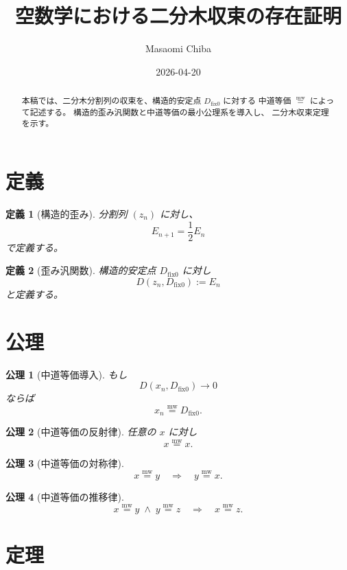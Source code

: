 \documentclass[12pt,a4paper]{article}
\newcommand{\mweq}{\mathrel{\overset{\mathrm{mw}}{=}}}
\newcommand{\dfix}{D_{\mathrm{fix}0}}
\newtheorem{definition}{定義}
\newtheorem{axiom}{公理}
\begin{document}
\title{空数学における二分木収束の存在証明}
\author{Masaomi Chiba}
\date{2026-04-20}
\maketitle

\begin{abstract}
本稿では、二分木分割列の収束を、構造的安定点 $\dfix$ に対する
中道等価 $\mweq$ によって記述する。
構造的歪み汎関数と中道等価の最小公理系を導入し、
二分木収束定理を示す。
\end{abstract}

\section{定義}

\begin{definition}[構造的歪み]
分割列 $(z_n)$ に対し、
\[
E_{n+1}=\frac12 E_n
\]
で定義する。
\end{definition}

\begin{definition}[歪み汎関数]
構造的安定点 $\dfix$ に対し
\[
D(z_n,\dfix):=E_n
\]
と定義する。
\end{definition}

\section{公理}

\begin{axiom}[中道等価導入]
もし
\[
D(x_n,\dfix)\to 0
\]
ならば
\[
x_n \mweq \dfix.
\]
\end{axiom}

\begin{axiom}[中道等価の反射律]
任意の $x$ に対し
\[
x \mweq x.
\]
\end{axiom}

\begin{axiom}[中道等価の対称律]
\[
x \mweq y
\quad\Rightarrow\quad
y \mweq x.
\]
\end{axiom}

\begin{axiom}[中道等価の推移律]
\[
x \mweq y
\;\land\;
y \mweq z
\quad\Rightarrow\quad
x \mweq z.
\]
\end{axiom}

\section{定理}
\end{document}
